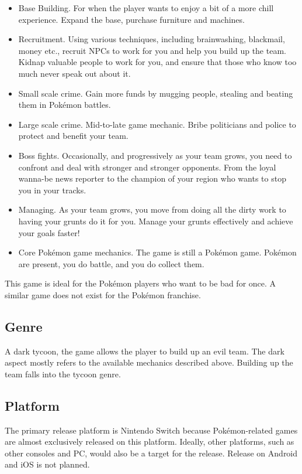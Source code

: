 \documentclass[a4paper,10pt,english]{article}
\begin{document}
\begin{itemize}
    \item Base Building. For when the player wants to enjoy a bit of a more chill experience. Expand the base, purchase furniture and machines.
    \item Recruitment. Using various techniques, including brainwashing, blackmail, money etc., recruit NPCs to work for you and help you build up the team. Kidnap valuable people to work for you, and ensure that those who know too much never speak out about it.
    \item Small scale crime. Gain more funds by mugging people, stealing and beating them in Pokémon battles. 
    \item Large scale crime. Mid-to-late game mechanic. Bribe politicians and police to protect and benefit your team. 
    \item Boss fights. Occasionally, and progressively as your team grows, you need to confront and deal with stronger and stronger opponents. From the loyal wanna-be news reporter to the champion of your region who wants to stop you in your tracks.
    \item Managing. As your team grows, you move from doing all the dirty work to having your grunts do it for you. Manage your grunts effectively and achieve your goals faster!
    \item Core Pokémon game mechanics. The game is still a Pokémon game. Pokémon are present, you do battle, and you do collect them. 
\end{itemize}

This game is ideal for the Pokémon players who want to be bad for once. A similar game does not exist for the Pokémon franchise. 


\subsection*{Genre}

A dark tycoon, the game allows the player to build up an evil team. The dark aspect mostly refers to the available mechanics described above. Building up the team falls into the tycoon genre.

\subsection*{Platform}

The primary release platform is Nintendo Switch because Pokémon-related games are almost exclusively released on this platform. Ideally, other platforms, such as other consoles and PC, would also be a target for the release. Release on Android and iOS is not planned.
\end{document}
